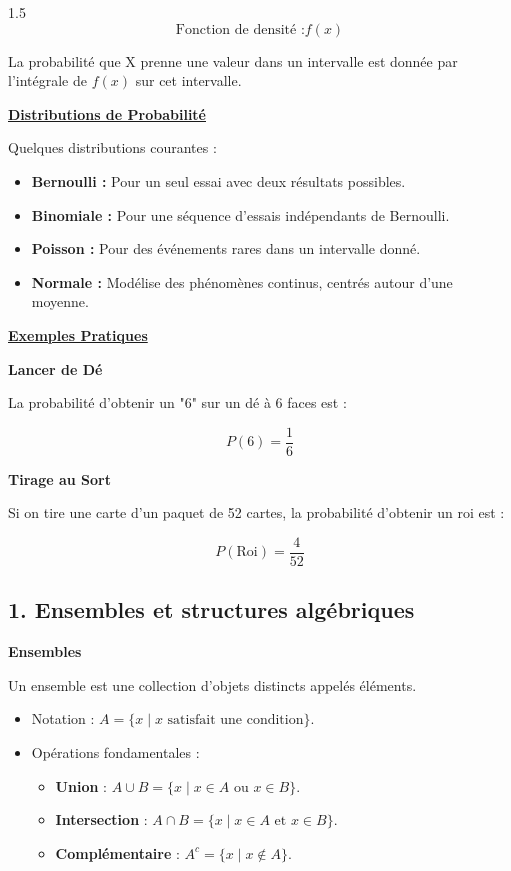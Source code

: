 \documentclass[12pt]{article}
\begin{document}
\begin{spacing}{1.5}
\[
\text{Fonction de densité :} f(x)
\]

La probabilité que X prenne une valeur dans un intervalle est donnée par l'intégrale de \( f(x) \) sur cet intervalle.

\textbf{\underline{Distributions de Probabilité}}

Quelques distributions courantes :

\begin{itemize}
    \item \textbf{Bernoulli :} Pour un seul essai avec deux résultats possibles.
    \item \textbf{Binomiale :} Pour une séquence d'essais indépendants de Bernoulli.
    \item \textbf{Poisson :} Pour des événements rares dans un intervalle donné.
    \item \textbf{Normale :} Modélise des phénomènes continus, centrés autour d'une moyenne.
\end{itemize}

\textbf{\underline{Exemples Pratiques}}

\textbf{Lancer de Dé}

La probabilité d'obtenir un "6" sur un dé à 6 faces est :

\[
P(6) = \frac{1}{6}
\]

\textbf{Tirage au Sort}

Si on tire une carte d'un paquet de 52 cartes, la probabilité d'obtenir un roi est :

\[
P(\text{Roi}) = \frac{4}{52}
\]

\quad

\quad

\subsection*{1. Ensembles et structures algébriques}

\quad\textbf{Ensembles}

Un ensemble est une collection d'objets distincts appelés éléments.
\begin{itemize}
    \item Notation : $A = \{x \mid x \text{ satisfait une condition}\}$.
    \item Opérations fondamentales : 
    \begin{itemize}
        \item \textbf{Union} : $A \cup B = \{x \mid x \in A \text{ ou } x \in B\}$.
        \item \textbf{Intersection} : $A \cap B = \{x \mid x \in A \text{ et } x \in B\}$.
        \item \textbf{Complémentaire} : $A^c = \{x \mid x \notin A\}$.
    \end{itemize}
\end{itemize}


\end{spacing}
\end{document}
